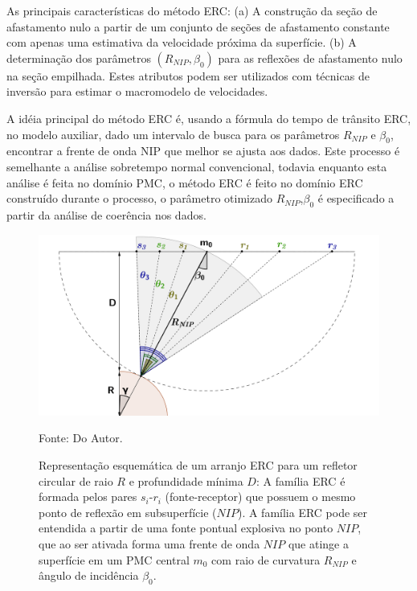 As principais características do método ERC:
(a) A construção da seção de afastamento nulo a partir de um conjunto de seções de afastamento constante
com apenas uma estimativa da velocidade próxima da superfície.
(b) A determinação dos parâmetros $(R_{NIP},\beta_0)$ para as reflexões de afastamento nulo na seção empilhada.
Estes atributos podem ser utilizados com técnicas de inversão para estimar o macromodelo de velocidades.

A idéia principal do método ERC é, usando a fórmula do tempo de trânsito ERC, no modelo auxiliar, dado um intervalo
de busca para os parâmetros $R_{NIP}$ e $\beta_0$, encontrar a frente de onda NIP que melhor se ajusta aos dados.
Este processo é semelhante a análise sobretempo normal convencional, todavia enquanto esta análise é feita no
domínio PMC, o método ERC é feito no domínio ERC construído durante o processo, o parâmetro otimizado $R_{NIP}$,$\beta_0$
é especificado a partir da análise de coerência nos dados.


\begin{figure}[htb]
\caption{Representação esquemática de um arranjo ERC para um refletor circular de raio $R$ e profundidade
mínima $D$: A família ERC é formada pelos pares $s_i$-$r_i$ (fonte-receptor) que possuem o mesmo ponto de
reflexão em subsuperfície ($NIP$). A família ERC pode ser entendida a partir de uma fonte pontual explosiva
no ponto $NIP$, que ao ser ativada forma uma frente de onda $NIP$ que atinge a superfície em um PMC central 
$m_0$ com raio de curvatura $R_{NIP}$ e ângulo de incidência $\beta_0$.}
\begin{center}
\includegraphics[scale=0.4]{images/cre.png}
\vspace{-0.3cm}
\end{center}
\begin{center}
 Fonte: Do Autor.
\end{center}
\label{fig:4.1}
\end{figure}


